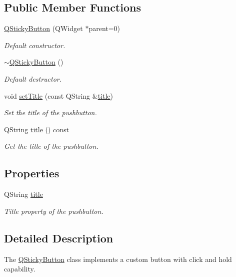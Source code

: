 \subsection*{Public Member Functions}
\begin{DoxyCompactItemize}
\item 
\hyperlink{class_q_sticky_button_ac2c3029091cc02ebcb32897511adbcb1}{Q\-Sticky\-Button} (Q\-Widget $\ast$parent=0)
\begin{DoxyCompactList}\small\item\em Default constructor. \end{DoxyCompactList}\item 
\hyperlink{class_q_sticky_button_ad5912bd79a895579588961f9e9d73572}{$\sim$\-Q\-Sticky\-Button} ()
\begin{DoxyCompactList}\small\item\em Default destructor. \end{DoxyCompactList}\item 
void \hyperlink{class_q_sticky_button_a5bac733cac165aac0b181a5b5d5976a3}{set\-Title} (const Q\-String \&\hyperlink{class_q_sticky_button_ad4ce92181d1cceab37cecdce54249e24}{title})
\begin{DoxyCompactList}\small\item\em Set the title of the pushbutton. \end{DoxyCompactList}\item 
Q\-String \hyperlink{class_q_sticky_button_a32a1b2b10c91b85f96e8e01876a81c18}{title} () const 
\begin{DoxyCompactList}\small\item\em Get the title of the pushbutton. \end{DoxyCompactList}\end{DoxyCompactItemize}
\subsection*{Properties}
\begin{DoxyCompactItemize}
\item 
Q\-String \hyperlink{class_q_sticky_button_ad4ce92181d1cceab37cecdce54249e24}{title}
\begin{DoxyCompactList}\small\item\em Title property of the pushbutton. \end{DoxyCompactList}\end{DoxyCompactItemize}


\subsection{Detailed Description}
The \hyperlink{class_q_sticky_button}{Q\-Sticky\-Button} class implements a custom button with click and hold capability. 

